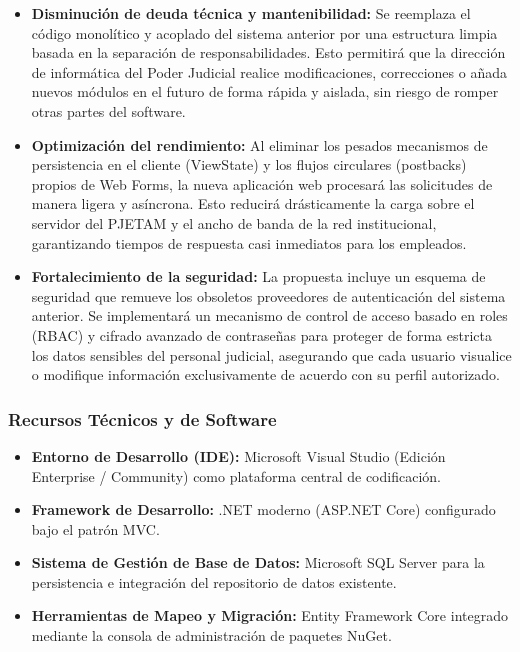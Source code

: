 \begin{itemize}
    \item \textbf{Disminución de deuda técnica y mantenibilidad:} Se reemplaza el código monolítico y acoplado del sistema anterior por una estructura limpia basada en la separación de responsabilidades. Esto permitirá que la dirección de informática del Poder Judicial realice modificaciones, correcciones o añada nuevos módulos en el futuro de forma rápida y aislada, sin riesgo de romper otras partes del software.
    \item \textbf{Optimización del rendimiento:} Al eliminar los pesados mecanismos de persistencia en el cliente (ViewState) y los flujos circulares (postbacks) propios de Web Forms, la nueva aplicación web procesará las solicitudes de manera ligera y asíncrona. Esto reducirá drásticamente la carga sobre el servidor del PJETAM y el ancho de banda de la red institucional, garantizando tiempos de respuesta casi inmediatos para los empleados.
    \item \textbf{Fortalecimiento de la seguridad:} La propuesta incluye un esquema de seguridad que remueve los obsoletos proveedores de autenticación del sistema anterior. Se implementará un mecanismo de control de acceso basado en roles (RBAC) y cifrado avanzado de contraseñas para proteger de forma estricta los datos sensibles del personal judicial, asegurando que cada usuario visualice o modifique información exclusivamente de acuerdo con su perfil autorizado.
\end{itemize}

\subsubsection{Recursos Técnicos y de Software}
\label{sec:recursos_tecnicos}

\begin{itemize}
    \item \textbf{Entorno de Desarrollo (IDE):} Microsoft Visual Studio (Edición Enterprise / Community) como plataforma central de codificación.
    \item \textbf{Framework de Desarrollo:} .NET moderno (ASP.NET Core) configurado bajo el patrón MVC.
    \item \textbf{Sistema de Gestión de Base de Datos:} Microsoft SQL Server para la persistencia e integración del repositorio de datos existente. 
    \item \textbf{Herramientas de Mapeo y Migración:} Entity Framework Core integrado mediante la consola de administración de paquetes NuGet.
\end{itemize}

